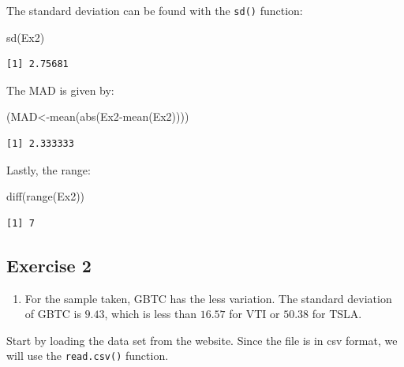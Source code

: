 \documentclass[
  letterpaper,
  DIV=11,
  numbers=noendperiod]{scrreprt}
\newenvironment{Shaded}{\begin{snugshade}}{\end{snugshade}}
\newcommand{\FunctionTok}[1]{\textcolor[rgb]{0.28,0.35,0.67}{#1}}
\newcommand{\NormalTok}[1]{\textcolor[rgb]{0.00,0.23,0.31}{#1}}
\newcommand{\OtherTok}[1]{\textcolor[rgb]{0.00,0.23,0.31}{#1}}
\newcommand{\SpecialCharTok}[1]{\textcolor[rgb]{0.37,0.37,0.37}{#1}}
\providecommand{\tightlist}{%
  \setlength{\itemsep}{0pt}\setlength{\parskip}{0pt}}\usepackage{longtable,booktabs,array}
\begin{document}
The standard deviation can be found with the \texttt{sd()} function:

\begin{Shaded}
\begin{Highlighting}[numbers=left,,]
\FunctionTok{sd}\NormalTok{(Ex2)}
\end{Highlighting}
\end{Shaded}

\begin{verbatim}
[1] 2.75681
\end{verbatim}

The MAD is given by:

\begin{Shaded}
\begin{Highlighting}[numbers=left,,]
\NormalTok{(MAD}\OtherTok{\textless{}{-}}\FunctionTok{mean}\NormalTok{(}\FunctionTok{abs}\NormalTok{(Ex2}\SpecialCharTok{{-}}\FunctionTok{mean}\NormalTok{(Ex2))))}
\end{Highlighting}
\end{Shaded}

\begin{verbatim}
[1] 2.333333
\end{verbatim}

Lastly, the range:

\begin{Shaded}
\begin{Highlighting}[numbers=left,,]
\FunctionTok{diff}\NormalTok{(}\FunctionTok{range}\NormalTok{(Ex2))}
\end{Highlighting}
\end{Shaded}

\begin{verbatim}
[1] 7
\end{verbatim}

\hypertarget{exercise-2-7}{%
\subsection*{Exercise 2}\label{exercise-2-7}}

\begin{enumerate}
\def\labelenumi{\arabic{enumi}.}
\tightlist
\item
  For the sample taken, GBTC has the less variation. The standard
  deviation of GBTC is \(9.43\), which is less than \(16.57\) for VTI or
  \(50.38\) for TSLA.
\end{enumerate}

Start by loading the data set from the website. Since the file is in csv
format, we will use the \texttt{read.csv()} function.
\end{document}
